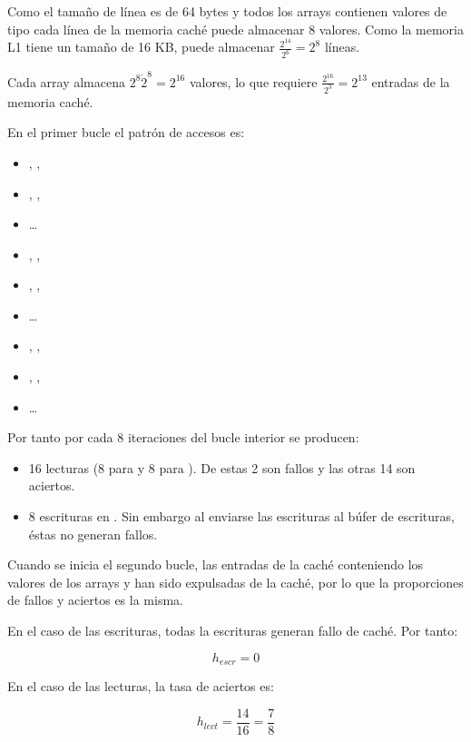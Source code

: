 Como el tamaño de línea es de 64 bytes y todos los arrays contienen valores de 
tipo  cada línea de la memoria caché puede almacenar 8 valores. 
Como la memoria L1 tiene un tamaño de 16 KB, puede almacenar $\frac{2^{14}}{2^6} = 2^8$ líneas.

Cada array almacena $2^8 \dot 2^8 = 2^{16}$ valores, lo que requiere $\frac{2^{16}}{2^3} = 2^{13}$
entradas de la memoria caché.

En el primer bucle el patrón de accesos es:

\begin{itemize}
  \item {}, , 
  \item {}, , 
  \item \ldots
  \item {}, , 
  \item {}, , 
  \item \ldots
  \item {}, , 
  \item {}, , 
  \item \ldots
\end{itemize}

Por tanto por cada 8 iteraciones del bucle interior se producen:

\begin{itemize}
  \item 16 lecturas (8 para  y 8 para ). De estas 2
        son fallos y las otras 14 son aciertos.
  \item 8 escrituras en . Sin embargo al enviarse las escrituras
        al búfer de escrituras, éstas no generan fallos.
\end{itemize}

Cuando se inicia el segundo bucle, las entradas de la caché conteniendo los valores de los arrays
 y  han sido expulsadas de la caché, por lo que la proporciones de fallos y
aciertos es la misma.

En el caso de las escrituras, todas la escrituras generan fallo de caché. Por tanto:

\[
h_{escr} = 0
\]

En el caso de las lecturas, la tasa de aciertos es:

\[
h_{lect}  = \frac{14}{16} = \frac{7}{8}
\]

